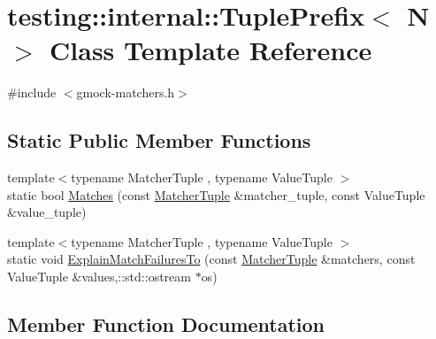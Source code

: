 \hypertarget{classtesting_1_1internal_1_1TuplePrefix}{}\section{testing\+:\+:internal\+:\+:Tuple\+Prefix$<$ N $>$ Class Template Reference}
\label{classtesting_1_1internal_1_1TuplePrefix}


{\ttfamily \#include $<$gmock-\/matchers.\+h$>$}

\subsection*{Static Public Member Functions}
\begin{DoxyCompactItemize}
\item 
{\footnotesize template$<$typename Matcher\+Tuple , typename Value\+Tuple $>$ }\\static bool \hyperlink{classtesting_1_1internal_1_1TuplePrefix_ada24ceee73c02e3bb7f8264143170f7a}{Matches} (const \hyperlink{structtesting_1_1internal_1_1MatcherTuple}{Matcher\+Tuple} \&matcher\+\_\+tuple, const Value\+Tuple \&value\+\_\+tuple)
\item 
{\footnotesize template$<$typename Matcher\+Tuple , typename Value\+Tuple $>$ }\\static void \hyperlink{classtesting_1_1internal_1_1TuplePrefix_af983f3f9254408e6dabe67b511dd22ae}{Explain\+Match\+Failures\+To} (const \hyperlink{structtesting_1_1internal_1_1MatcherTuple}{Matcher\+Tuple} \&matchers, const Value\+Tuple \&values,\+::std\+::ostream $\ast$os)
\end{DoxyCompactItemize}


\subsection{Member Function Documentation}
